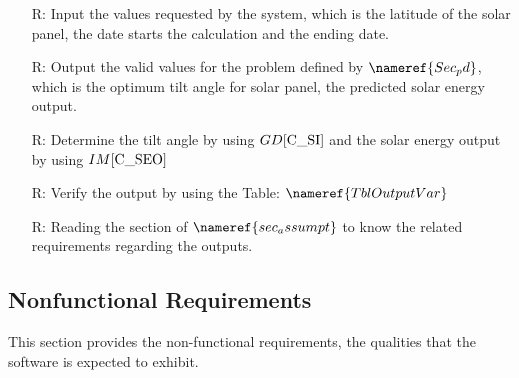 \documentclass[12pt]{article}
\newcommand{\dref}[1]{GD\ref{#1}}
\newcommand{\iref}[1]{IM\ref{#1}}
\newcounter{reqnum} %
\begin{document}
\noindent \begin{itemize}

\item[R\refstepcounter{reqnum}\thereqnum \label{R_Inputs}:] Input the values 
requested by the system, which is the latitude of the solar panel, the date starts the calculation and the ending date.

\item[R\refstepcounter{reqnum}\thereqnum \label{R_OutputInputs}:] Output the 
valid values for the problem defined by $\nameref{Sec_pd} $, which is the optimum 
tilt angle for solar panel, the predicted solar energy output.

\item[R\refstepcounter{reqnum}\thereqnum \label{R_Calculate}:] Determine the tilt angle 
by using $\dref{C_SI}$ and the solar energy output by using $\iref{C_SEO}$

\item[R\refstepcounter{reqnum}\thereqnum \label{R_VerifyOutput}:] Verify the output 
by using the Table: $\nameref{TblOutputVar}$

\item[R\refstepcounter{reqnum}\thereqnum \label{R_Output}:]Reading the section of 
$\nameref{sec_assumpt}$ to know the related requirements regarding the outputs.

\end{itemize}

\subsection{Nonfunctional Requirements}

This section provides the non-functional requirements, the qualities that the software is
expected to exhibit.
\end{document}
